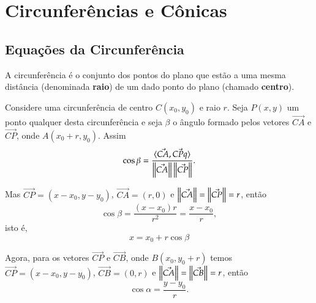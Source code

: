 
\chapter{Circunfer\^encias e C\^onicas} %
\label{cha:circunferencias_e_conicas}

\section{Equa\c{c}\~oes da Circunfer\^encia} %
\label{sec:equacoes_da_circunferencias}

\begin{definicao}
  A circunfer\^encia \'e o conjunto dos pontos do plano que est\~ao a uma mesma dist\^ancia (denominada \textbf{raio}) de um dado ponto do plano (chamado \textbf{centro}).
\end{definicao}

Considere uma circunfer\^encia de centro $C(x_0,y_0)$ e raio $r$. Seja $P(x,y)$ um ponto qualquer desta circunfer\^encia e seja $\beta$ o \^angulo formado pelos vetores $\vec{CA}$ e $\vec{CP}$, onde $A(x_0 + r, y_0)$. Assim
\[
  \cos\beta = \dfrac{\langle \vec{CA}, \vec{CPq} \rangle}{\left\lVert\vec{CA}\right\rVert\left\Vert{\vec{CP}}\right\Vert}.
\]

Mas $\vec{CP} = (x - x_0, y - y_0)$, $\vec{CA} = (r, 0)$ e $\left\Vert{\vec{CA}}\right\Vert = \left\Vert{\vec{CP}}\right\Vert = r$, ent\~ao
\[
  \cos\beta = \dfrac{(x - x_0)r}{r^2} = \dfrac{x - x_0}{r},
\]
isto \'e,
\begin{equation}\label{equacaoparametricaX}
  x = x_0 + r\cos\beta
\end{equation}

Agora, para os vetores $\vec{CP}$ e $\vec{CB}$, onde $B(x_0, y_0 + r)$ temos $\vec{CP} = (x - x_0, y - y_0)$, $\vec{CB} = (0, r)$ e $\left\Vert{\vec{CA}}\right\Vert = \left\Vert{\vec{CB}}\right\Vert = r$, ent\~ao
\begin{equation}\label{equacaoinicialY}
  \cos\alpha = \dfrac{y - y_0}{r}.
\end{equation}

